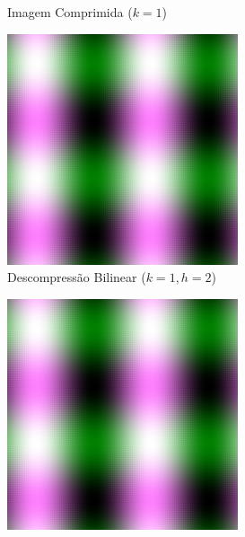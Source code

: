\documentclass[12pt, a4paper]{article}
\begin{document}
\begin{figure}[H]
\begin{subfigure}[b]{0.45\textwidth}
        \caption{Imagem Comprimida ($k=1$)}
        \label{fig:zoo_compressed_k1}
    \end{subfigure}
    
    \vspace{0.5cm}
    
    \begin{subfigure}[b]{0.45\textwidth}
        \centering
        \includegraphics[width=\textwidth]{results/case_1/bilinear_decompressed_k1_h2.png}
        \caption{Descompressão Bilinear ($k=1, h=2$)}
        \label{fig:zoo_bilinear_k1h2}
    \end{subfigure}
    \hfill
    \begin{subfigure}[b]{0.45\textwidth}
        \centering
        \includegraphics[width=\textwidth]{results/case_1/bicubic_decompressed_k1_h2.png}

\end{subfigure}
\end{figure}
\end{document}
